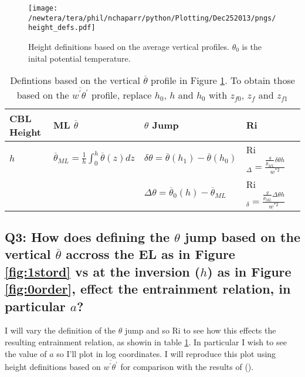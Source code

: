 \begin{figure}[htbp]
    \centering
    \texttt{[image: /newtera/tera/phil/nchaparr/python/Plotting/Dec252013/pngs/height\_defs.pdf]}
    \caption{Height definitions based on the average vertical profiles. $\theta_{0}$ is the inital potential temperature.}
    \label{fig:hdefs}   %
\end{figure}

\begin{table}[htbp]
    \begin{center}
    \begin{tabular}{ p{2cm} p{4cm}  p{3cm}  p{3cm} p{3cm} }
      \acs{CBL} Height & \acs{ML} $\overline{\theta}$ & $\theta$ Jump & \acs{Ri} \\ \hline 
       $h$ & $\overline{\theta}_{ML} = \frac{1}{h}\int^{h}_{0}\overline{\theta}(z)dz$ & $\delta \theta=\overline{\theta}(h_{1})-\overline{\theta}(h_{0})$ & \acs{Ri}$_{\Delta}=\frac{\frac{g}{\overline{\theta}_{ML}}\delta \theta h}{w^{*2}}$  \\ [.3cm] %
        
       & &$\Delta \theta = \overline{\theta}_{0}(h)- \overline{\theta}_{ML}$ & \acs{Ri}$_{\delta}=\frac{\frac{g}{\overline{\theta}_{ML}} \Delta \theta h}{w^{*2}}$ \\ \hline
      \end{tabular}
\caption{Defintions based on the vertical $\overline{\theta}$ profile in Figure \ref{fig:hdefs}.  To obtain those based on the $\overline{w^{'}\theta^{'}}$ profile, replace $h_{0}$, $h$ and $h_{0}$ with $z_{f0}$, $z_{f}$ and $z_{f1}$}
\label{table:reldefs}   
\end{center}    
\end{table}

\subsection{Q3: How does defining the $\theta$ jump based on the vertical $\overline{\theta}$ accross the \acs{EL} as in Figure \ref{fig:1stord} vs at the inversion ($h$) as in Figure \ref{fig:0order}, effect the entrainment relation, in particular $a$?}

I will vary the definition of the $\theta$ jump and so \acs{Ri} to see how this effects the resulting entrainment relation, as showin in table \ref{table:reldefs}.  In particular I wish to see the value of $a$ so I'll plot in log coordinates.  I will reproduce this plot using height definitions based on $\overline{w^{'}\theta^{'}}$ for comparison with the results of \citeauthor{FedConzMir04} (\citeyear{FedConzMir04}).

